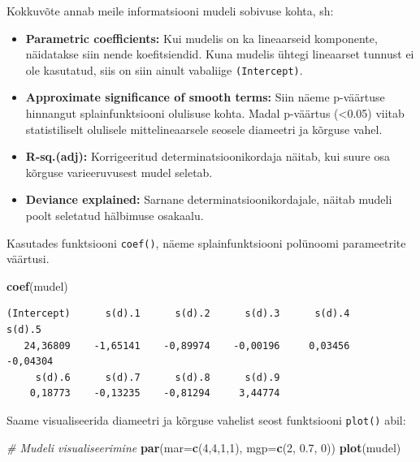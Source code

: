 \documentclass[
]{book}
\newenvironment{Shaded}{\begin{snugshade}}{\end{snugshade}}
\newcommand{\AttributeTok}[1]{\textcolor[rgb]{0.13,0.29,0.53}{#1}}
\newcommand{\CommentTok}[1]{\textcolor[rgb]{0.56,0.35,0.01}{\textit{#1}}}
\newcommand{\DecValTok}[1]{\textcolor[rgb]{0.00,0.00,0.81}{#1}}
\newcommand{\FloatTok}[1]{\textcolor[rgb]{0.00,0.00,0.81}{#1}}
\newcommand{\FunctionTok}[1]{\textcolor[rgb]{0.13,0.29,0.53}{\textbf{#1}}}
\newcommand{\NormalTok}[1]{#1}
\providecommand{\tightlist}{%
  \setlength{\itemsep}{0pt}\setlength{\parskip}{0pt}}
\renewenvironment{Shaded} {\begin{snugshade}\footnotesize} {\end{snugshade}}
\theoremstyle{definition}
\theoremstyle{definition}
\theoremstyle{definition}
\theoremstyle{definition}
\theoremstyle{remark}
\begin{document}
Kokkuvõte annab meile informatsiooni mudeli sobivuse kohta, sh:

\begin{itemize}
\tightlist
\item
  \textbf{Parametric coefficients:} Kui mudelis on ka lineaarseid komponente, näidatakse siin nende koefitsiendid. Kuna mudelis ühtegi lineaarset tunnust ei ole kasutatud, siis on siin ainult vabaliige \texttt{(Intercept)}.
\item
  \textbf{Approximate significance of smooth terms:} Siin näeme p-väärtuse hinnangut splainfunktsiooni olulisuse kohta. Madal p-väärtus (\textless0.05) viitab statistiliselt olulisele mittelineaarsele seosele diameetri ja kõrguse vahel.
\item
  \textbf{R-sq.(adj):} Korrigeeritud determinatsioonikordaja näitab, kui suure osa kõrguse varieeruvusest mudel seletab.
\item
  \textbf{Deviance explained:} Sarnane determinatsioonikordajale, näitab mudeli poolt seletatud hälbimuse osakaalu.
\end{itemize}

Kasutades funktsiooni \texttt{coef()}, näeme splainfunktsiooni polünoomi parameetrite väärtusi.

\begin{Shaded}
\begin{Highlighting}[]
\FunctionTok{coef}\NormalTok{(mudel)}
\end{Highlighting}
\end{Shaded}

\begin{verbatim}
(Intercept)      s(d).1      s(d).2      s(d).3      s(d).4      s(d).5 
   24,36809    -1,65141    -0,89974    -0,00196     0,03456    -0,04304 
     s(d).6      s(d).7      s(d).8      s(d).9 
    0,18773    -0,13235    -0,81294     3,44774 
\end{verbatim}

Saame visualiseerida diameetri ja kõrguse vahelist seost funktsiooni \texttt{plot()} abil:

\begin{Shaded}
\begin{Highlighting}[]
\CommentTok{\# Mudeli visualiseerimine}
\FunctionTok{par}\NormalTok{(}\AttributeTok{mar=}\FunctionTok{c}\NormalTok{(}\DecValTok{4}\NormalTok{,}\DecValTok{4}\NormalTok{,}\DecValTok{1}\NormalTok{,}\DecValTok{1}\NormalTok{), }\AttributeTok{mgp=}\FunctionTok{c}\NormalTok{(}\DecValTok{2}\NormalTok{, }\FloatTok{0.7}\NormalTok{, }\DecValTok{0}\NormalTok{))}
\FunctionTok{plot}\NormalTok{(mudel)}
\end{Highlighting}
\end{Shaded}
\end{document}
